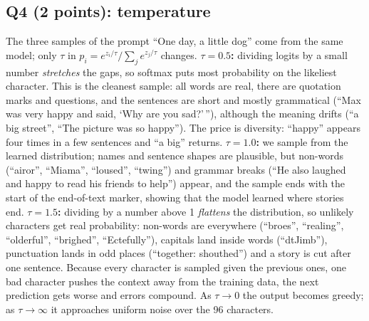 \documentclass[10pt,twocolumn]{article}
\begin{document}
\subsection*{Q4 (2 points): temperature}
The three samples of the prompt ``One day, a little dog'' come from the same model; only $\tau$ in $p_i=e^{z_i/\tau}/\sum_je^{z_j/\tau}$ changes. \textbf{$\tau=0.5$:} dividing logits by a small number \emph{stretches} the gaps, so softmax puts most probability on the likeliest character. This is the cleanest sample: all words are real, there are quotation marks and questions, and the sentences are short and mostly grammatical (``Max was very happy and said, `Why are you sad?'\,''), although the meaning drifts (``a big street'', ``The picture was so happy''). The price is diversity: ``happy'' appears four times in a few sentences and ``a big'' returns. \textbf{$\tau=1.0$:} we sample from the learned distribution; names and sentence shapes are plausible, but non-words (``airor'', ``Miama'', ``loused'', ``twing'') and grammar breaks (``He also laughed and happy to read his friends to help'') appear, and the sample ends with the start of the end-of-text marker, showing that the model learned where stories end. \textbf{$\tau=1.5$:} dividing by a number above 1 \emph{flattens} the distribution, so unlikely characters get real probability: non-words are everywhere (``broes'', ``realing'', ``olderful'', ``brighed'', ``Ectefully''), capitals land inside words (``dtJimb''), punctuation lands in odd places (``together: shouthed'') and a story is cut after one sentence. Because every character is sampled given the previous ones, one bad character pushes the context away from the training data, the next prediction gets worse and errors compound. As $\tau\to0$ the output becomes greedy; as $\tau\to\infty$ it approaches uniform noise over the 96 characters.
\end{document}
